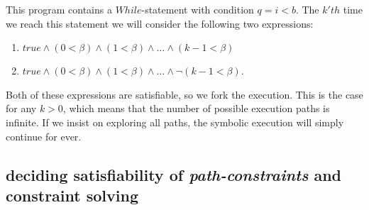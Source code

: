 	This program contains a $While$-statement with condition $q = i < b$. The $k'th$ time we reach this statement we will consider the following two expressions:
	\begin{enumerate}
		\item $true \land (0 < \beta) \land (1 < \beta) \land \ldots \land (k-1 < \beta) $
		\item $true \land (0 < \beta) \land (1 < \beta) \land \ldots \land \neg (k-1 < \beta) $.
	\end{enumerate}
	Both of these expressions are satisfiable, so we fork the execution. This is the case for any $k > 0$, which means that the number of possible execution paths is infinite. If we insist on exploring all paths, the symbolic execution will simply continue for ever. 
	
	\subsection{deciding satisfiability of \emph{path-constraints} and constraint solving}
	